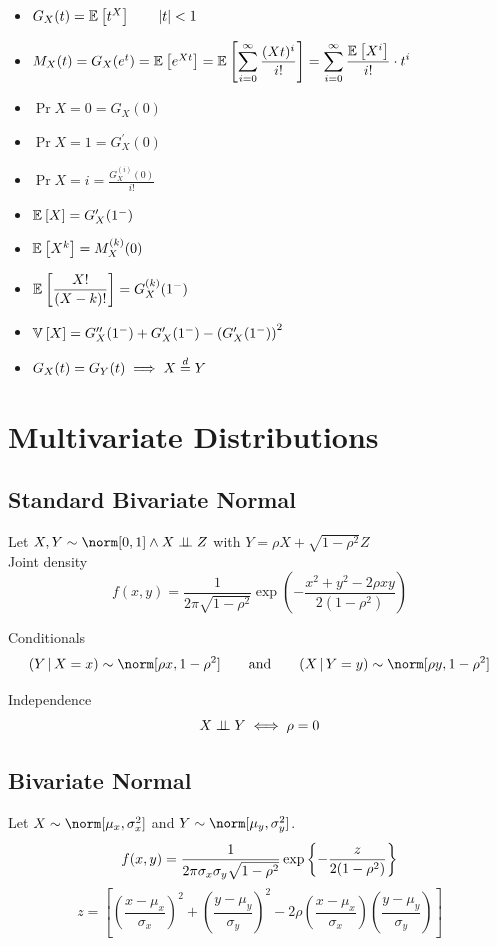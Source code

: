 \documentclass[landscape]{article}
\begin{document}
\begin{multicols*}{2}
\begin{itemize}
  \item $G_X(t) = \mathbb{E}_{}\left[t^X\right] \qquad |t| < 1$
  \item $M_X(t) = G_X(e^t) = \mathbb{E}_{}\left[e^{Xt}\right] 
    = \mathbb{E}_{}\left[ \displaystyle\sum_{i=0}^\infty \frac{(Xt)^i}{i!}\right]
    = \displaystyle\sum_{i=0}^\infty \frac{\mathbb{E}_{}\left[X^i\right]}{i!}\cdot t^i$
  \item $\Pr{X=0} = G_X(0)$
  \item $\Pr{X=1}=G_X^\prime(0)$
  \item $\Pr{X=i} = \displaystyle\frac{G_X^{(i)}(0)}{i!}$
  \item $\mathbb{E}_{}\left[X\right] = G_X^\prime(1^-)$
  \item $\mathbb{E}_{}\left[X^k\right] = M_X^{(k)}(0)$
  \item $\mathbb{E}_{}\left[\displaystyle\frac{X!}{(X-k)!}\right] = G_X^{(k)}(1^-)$
  \item $\mathbb{V}_{}\left[X\right] = G_X^{\prime\prime}(1^-) + G_X^\prime(1^-) 
    - \left(G_X^\prime(1^-)\right)^2$
  \item $G_X(t) = G_Y(t) \;\Longrightarrow\; X \stackrel{d}{=} Y$
\end{itemize}

\section{Multivariate Distributions}

\subsection{Standard Bivariate Normal}

Let $X,Y\dist\norm[0,1] \wedge X\ind Z$ with 
$Y = \rho X + \sqrt{1-\rho^2}Z$\\

Joint density
$$f(x,y) = \frac{1}{2 \pi \sqrt{1-\rho^2}}
  \exp
  \left(
  -\frac{x^2 + y^2 - 2\rho x y}{2 (1-\rho^2)}
  \right)
$$

Conditionals
$$
(Y\giv X=x) \dist \norm[\rho x,1-\rho^2] \qquad\text{and}\qquad
(X\giv Y=y) \dist \norm[\rho y,1-\rho^2]
$$

Independence 
$$X \perp\!\!\!\perp Y \;\Longleftrightarrow\; \rho = 0$$

\subsection{Bivariate Normal}

Let $X\dist\norm[\mu_x,\sigma_x^2]$ and $Y\dist\norm[\mu_y,\sigma_y^2]$.
$$f(x,y) = \frac{1}{2 \pi \sigma_x \sigma_y \sqrt{1-\rho^2}}
\exp\left\{-\frac{z}{2 (1-\rho^2)}\right\}$$
$$ z = 
  \left[
  \left(\frac{x-\mu_x}{\sigma_x}\right)^2 
    + \left(\frac{y-\mu_y}{\sigma_y}\right)^2
    - 2\rho\left(\frac{x-\mu_x}{\sigma_x}\right)
      \left(\frac{y-\mu_y}{\sigma_y}\right)
  \right]
$$


\end{multicols*}
\end{document}

